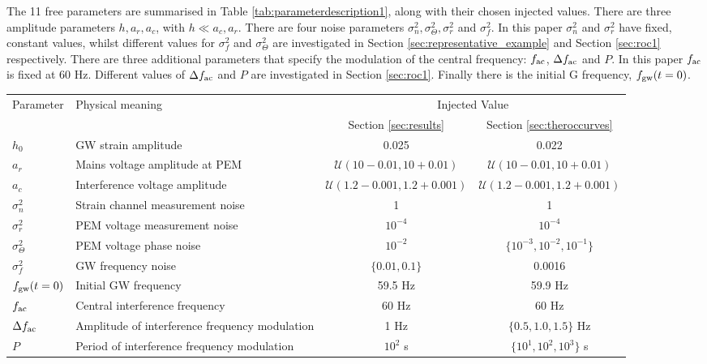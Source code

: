 \documentclass[pra,superscriptaddress,reprint,amsmath,amssymb,nofootinbib]{revtex4-2}
\begin{document}
The 11 free parameters are summarised in Table \ref{tab:parameterdescription1}, along with their chosen injected values. There are three amplitude parameters $h, a_r, a_c$, with $h \ll a_c, a_r$. There are four noise parameters $\sigma_n^2, \sigma_{\Theta}^2, \sigma_r^2$ and  $\sigma_f^2$. In this paper $\sigma_n^2$ and $\sigma_r^2$ have fixed, constant values, whilst different values for $\sigma_f^2$ and $\sigma_{\Theta}^2$ are investigated in Section \ref{sec:representative_example} and Section \ref{sec:roc1} respectively. There are three additional parameters that specify the modulation of the central frequency: $f_{\rm ac}$, $\Delta f_{\rm ac}$ and $P$. In this paper $f_{\rm ac}$ is fixed at 60 Hz. Different values of $\Delta f_{\rm ac}$ and $P$ are investigated in Section \ref{sec:roc1}. Finally there is the initial G frequency, $f_{\rm gw}(t=0)$.
\begin{table}
	
	\begin{tabular}{llcc}
		\hline 
		
		 \multirow{2}{*}{Parameter} & \multirow{2}{*}{Physical meaning}  & \multicolumn{2}{c}{Injected Value} \\
		\cline{3-4}
			 &  &Section \ref{sec:results} & Section \ref{sec:theroccurves}    \\
		\hline
		$h_0$  &    GW strain amplitude & 0.025& 0.022 \\ 
		$a_r$ & Mains voltage amplitude at PEM & $\mathcal{U}(10-0.01,10+0.01)$& $\mathcal{U}(10-0.01,10+0.01)$ \\
		$a_c$ & Interference voltage amplitude &$\mathcal{U}(1.2-0.001,1.2+0.001)$& $\mathcal{U}(1.2-0.001,1.2+0.001)$ \\
		$\sigma_n^2$ & Strain channel measurement noise &1& 1 \\
		$\sigma_r^2$  & PEM voltage measurement noise & $10^{-4}$&$10^{-4}$ \\
		$\sigma_{\Theta}^2$ & PEM voltage phase noise  & $10^{-2}$& $\{ 10^{-3}, 10^{-2}, 10^{-1}\}$\\
		$\sigma^2_f$ &  GW frequency noise & $\{0.01,0.1\}$& 0.0016\\
		$f_{\rm gw}(t=0)$ &  Initial GW frequency  & 59.5 Hz& 59.9 Hz\\
		$ f_{\rm ac}$ &  Central interference frequency & 60 Hz& 60 Hz\\ 
		$\Delta f_{\rm ac}$ &  Amplitude of interference frequency modulation  & 1 Hz& $\{0.5, 1.0, 1.5\}$ Hz\\
		$P$ & Period of interference frequency modulation & $10^2$ s& $\{ 10^{1}, 10^2, 10^3\}$ s \\
		\hline
		

\end{tabular}
\end{table}
\end{document}
